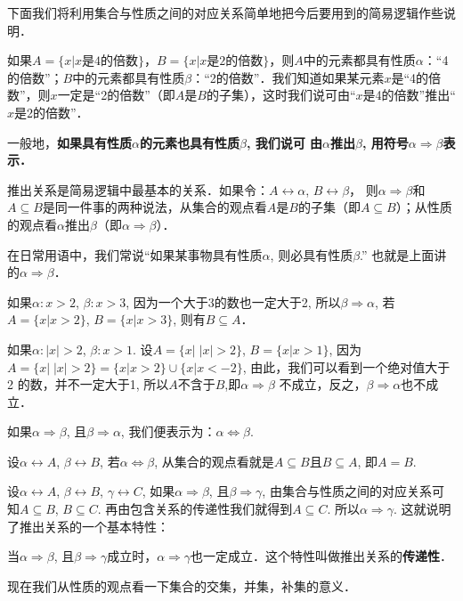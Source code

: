 下面我们将利用集合与性质之间的对应关系简单地把今后要用到的简易逻辑作些说明．

如果$A=\{x|x\text{是4的倍数}\}$，$B=\{x|x\text{是2的倍数}\}$，则$A$中的元素都具有性质$\alpha$：“4的倍数”；$B$中的元素都具有性质$\beta$：“2的倍数”．我们知道如果某元素$x$是“4的倍数”，则$x$一定是“2的倍数”（即$A$是$B$的子集），这时我们说可由“$x$是4的倍数”推出“$x$是2的倍数”．

一般地，\textbf{如果具有性质$\alpha$的元素也具有性质$\beta$, 我们说可
	由$\alpha$推出$\beta$, 用符号$\alpha\Rightarrow\beta$表示．}

推出关系是简易逻辑中最基本的关系．如果令：$A\longleftrightarrow \alpha$, $ B\longleftrightarrow \beta$，
则$\alpha\Rightarrow\beta$和$A\subseteq B$是同一件事的两种说法，从集合的观点看$A$是$B$的子集（即$A\subseteq B$）；从性质的观点看$\alpha$推出$\beta$（即$\alpha\Rightarrow\beta$）．

在日常用语中，我们常说“如果某事物具有性质$\alpha$, 则必具有性质$\beta$.” 也就是上面讲的$\alpha\Rightarrow\beta$．

如果$\alpha :x>2$, $\beta :x>3$, 因为一个大于3的数也一定大于2, 所以$\beta \Rightarrow\alpha$, 若$A=\{ x|x>2\}$, $B=\{ x|x>3\}$, 则有$B\subseteq A$．

如果$\alpha :|x|>2$, $\beta :x>1$. 设$A=\{x|\; |x|>2\}$, $B=\{ x| x>1\}$, 因为$A=\{ x|\; |x|>2\}=\{x|x>2\}\cup\{x|x<-2\}$, 由此，我们可以看到一个绝对值大于2
的数，并不一定大于1, 所以$A$不含于$B$,即$\alpha \Rightarrow\beta$ 不成立，反之，$\beta \Rightarrow \alpha$也不成立．

如果$\alpha \Rightarrow\beta$, 且$\beta \Rightarrow\alpha$, 我们便表示为：$\alpha\Longleftrightarrow \beta$.

设$\alpha \longleftrightarrow A$, $\beta \longleftrightarrow B$, 若$\alpha \Longleftrightarrow\beta$, 从集合的观点看就是$A\subseteq B$且$B\subseteq A$, 即$A=B$.

设$\alpha \longleftrightarrow A$, $\beta \longleftrightarrow B$, $\gamma\longleftrightarrow C$, 如果$\alpha \Rightarrow\beta$, 且$\beta \Rightarrow\gamma$, 由集合与性质之间的对应关系可知$A\subseteq B$, $B\subseteq C$. 再由包含关系的传递性我们就得到$A\subseteq C$. 所以$\alpha \Rightarrow\gamma$. 这就说明了推出关系的一个基本特性：

当$\alpha \Rightarrow\beta$, 且$\beta \Rightarrow\gamma$成立时，$\alpha \Rightarrow\gamma$也一定成立．这个特性叫做推出关系的\textbf{传递性}．

现在我们从性质的观点看一下集合的交集，并集，补集的意义．

